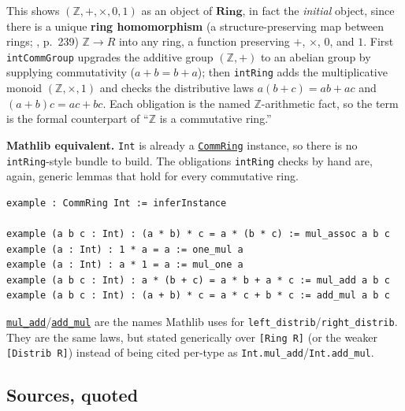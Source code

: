 \begin{mathreading}

This shows \((\mathbb{Z}, +, \times, 0, 1)\) as an object of \(\mathbf{Ring}\), in fact the \emph{initial} object, since there is a unique \textbf{ring homomorphism} (a structure-preserving map between rings; \cite{DummitFoote2003}, p.~239) \(\mathbb{Z} \to R\) into any ring, a function preserving \(+\), \(\times\), \(0\), and \(1\). First \texttt{intCommGroup} upgrades the additive group \((\mathbb{Z},+)\) to an abelian group by supplying commutativity (\(a + b = b + a\)); then \texttt{intRing} adds the multiplicative monoid \((\mathbb{Z}, \times, 1)\) and checks the distributive laws \(a(b+c) = ab + ac\) and \((a+b)c = ac + bc\). Each obligation is the named \(\mathbb{Z}\)-arithmetic fact, so the term is the formal counterpart of ``\(\mathbb{Z}\) is a commutative ring.''

\end{mathreading}

\textbf{Mathlib equivalent.} \texttt{Int} is already a \href{https://loogle.lean-lang.org/?q=CommRing}{\texttt{CommRing}} instance, so there is no \texttt{intRing}-style bundle to build. The obligations \texttt{intRing} checks by hand are, again, generic lemmas that hold for every commutative ring.

\begin{lstlisting}
example : CommRing Int := inferInstance

example (a b c : Int) : (a * b) * c = a * (b * c) := mul_assoc a b c
example (a : Int) : 1 * a = a := one_mul a
example (a : Int) : a * 1 = a := mul_one a
example (a b c : Int) : a * (b + c) = a * b + a * c := mul_add a b c
example (a b c : Int) : (a + b) * c = a * c + b * c := add_mul a b c
\end{lstlisting}

\href{https://loogle.lean-lang.org/?q=mul_add}{\texttt{mul\_\allowbreak{}add}}/\href{https://loogle.lean-lang.org/?q=add_mul}{\texttt{add\_\allowbreak{}mul}} are the names Mathlib uses for \texttt{left\_\allowbreak{}distrib}/\texttt{right\_\allowbreak{}distrib}. They are the same laws, but stated generically over \texttt{[Ring R]} (or the weaker \texttt{[Distrib R]}) instead of being cited per-type as \texttt{Int.mul\_\allowbreak{}add}/\texttt{Int.add\_\allowbreak{}mul}.

\subsection{Sources, quoted}\label{sec:09-rings:04-integers-example:2}

